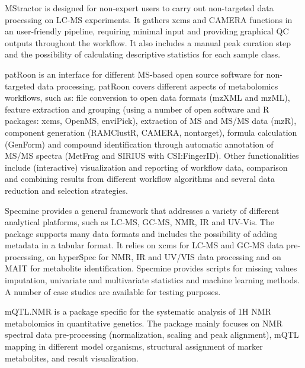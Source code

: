 \documentclass[]{article}
\begin{document}
MStractor is designed for non-expert users to carry out non-targeted data processing on LC-MS experiments. It gathers xcms and CAMERA functions in an user-friendly pipeline, requiring minimal input and providing graphical QC outputs throughout the workflow. It also includes a manual peak curation step and the possibility of calculating descriptive statistics for each sample class.

patRoon is an interface for different MS-based open source software for non-targeted data processing. patRoon covers different aspects of metabolomics workflows, such as: file conversion to open data formats (mzXML and mzML), feature extraction and grouping (using a number of open software and R packages: xcms, OpenMS, enviPick), extraction of MS and MS/MS data (mzR), component generation (RAMClustR, CAMERA, nontarget), formula calculation (GenForm) and compound identification through automatic annotation of MS/MS spectra (MetFrag and SIRIUS with CSI:FingerID). Other functionalities include (interactive) visualization and reporting of workflow data, comparison and combining results from different workflow algorithms and several data reduction and selection strategies.

Specmine provides a general framework that addresses a variety of different analytical platforms, such as LC-MS, GC-MS, NMR, IR and UV-Vis. The package supports many data formats and includes the possibility of adding metadata in a tabular format. It relies on xcms for LC-MS and GC-MS data pre-processing, on hyperSpec for NMR, IR and UV/VIS data processing and on MAIT for metabolite identification. Specmine provides scripts for missing values imputation, univariate and multivariate statistics and machine learning methods. A number of case studies are available for testing purposes.

mQTL.NMR is a package specific for the systematic analysis of 1H NMR metabolomics in quantitative genetics. The package mainly focuses on NMR spectral data pre-processing (normalization, scaling and peak alignment), mQTL mapping in different model organisms, structural assignment of marker metabolites, and result visualization.
\end{document}
